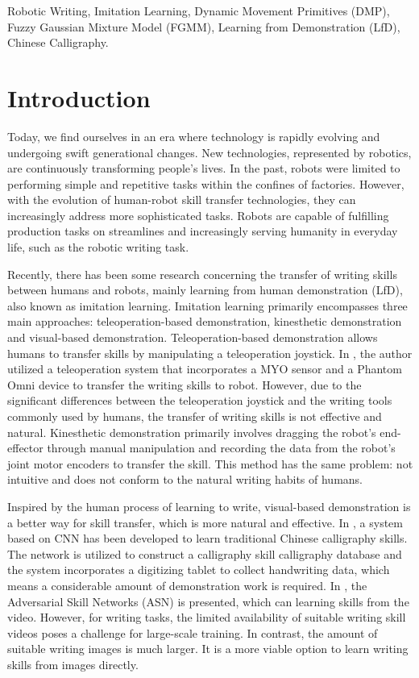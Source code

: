 \documentclass[conference]{IEEEtran}
\begin{document}
\begin{IEEEkeywords}
Robotic Writing, Imitation Learning, Dynamic Movement Primitives (DMP), Fuzzy Gaussian Mixture Model (FGMM), Learning from Demonstration (LfD), Chinese Calligraphy.
\end{IEEEkeywords}

\section{Introduction}
Today, we find ourselves in an era where technology is rapidly evolving and undergoing swift generational changes. New technologies, represented by robotics, are continuously transforming people's lives. In the past, robots were limited to performing simple and repetitive tasks within the confines of factories. However, with the evolution of human-robot skill transfer technologies, they can increasingly address more sophisticated tasks. Robots are capable of fulfilling production tasks on streamlines and increasingly serving humanity in everyday life, such as the robotic writing task.

Recently, there has been some research concerning the transfer of writing skills between humans and robots, mainly learning from human demonstration (LfD), also known as imitation learning. Imitation learning primarily encompasses three main approaches: teleoperation-based demonstration, kinesthetic demonstration and visual-based demonstration. Teleoperation-based demonstration  allows humans to transfer skills by manipulating a teleoperation joystick. In \cite{Yang2015}, the author utilized a teleoperation system that incorporates a MYO sensor and a Phantom Omni device to transfer the writing skills to robot. However, due to the significant differences between the teleoperation joystick and the writing tools commonly used by humans, the transfer of writing skills is not effective and natural. Kinesthetic demonstration primarily involves dragging the robot's end-effector through manual manipulation and recording the data from the robot's joint motor encoders to transfer the skill. This method has the same problem: not intuitive and does not conform to the natural writing habits of humans. 

Inspired by the human process of learning to write, visual-based demonstration is a better way for skill transfer, which is more natural and effective. In \cite{Zhang2019}, a system based on CNN has been developed to learn traditional Chinese calligraphy skills. The network is utilized to construct a calligraphy skill calligraphy database and the system incorporates a digitizing tablet to collect handwriting data, which means a considerable amount of demonstration work is required. In \cite{Mees2020}, the Adversarial Skill Networks (ASN) is presented, which can learning skills from the video. However, for writing tasks, the limited availability of suitable writing skill videos poses a challenge for large-scale training. In contrast, the amount of suitable writing images is much larger. It is a more viable option to learn writing skills from images directly.
\end{document}
